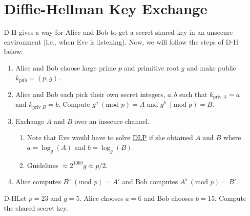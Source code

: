 \section{Diffie-Hellman Key Exchange}

D-H gives a way for Alice and Bob to get a secret shared key in an unsecure environment (i.e., when Eve is listening). Now, we will follow the steps of D-H below:

\begin{enumerate}[label=\arabic*.]
    \item Alice and Bob choose large prime \(p\) and primitive root \(g\) and make public \(k_{\text{pub}} = (p,g)\).
    \item Alice and Bob each pick their own secret integers, \(a,b\) such that \(k_{\text{priv } A} = a\) and \(k_{\text{priv } B} = b\). Compute \(g^a \ (\text{mod } p) = A\) and \(g^b \ (\text{mod } p) = B\).
    \item Exchange \(A\) and \(B\) over an insecure channel.
          \begin{enumerate}[label=\roman*.]
              \item Note that Eve would have to solve \hyperlink{Discrete Logarithm Problem}{DLP} if she obtained \(A\) and \(B\) where \(a = \log_g(A)\) and \(b = \log_g(B)\).
              \item Guidelines \(\approx 2^{1000} g \approx p/2\).
          \end{enumerate}
    \item Alice computes \(B^a \ (\text{mod } p) = A'\) and Bob computes \(A^b \ (\text{mod } p) = B'\).
\end{enumerate}

\begin{example}
    {D-H}Let \(p = 23\) and \(g = 5\). Alice chooses \(a = 6\) and Bob chooses \(b = 15\). Compute the shared secret key.
\end{example}



